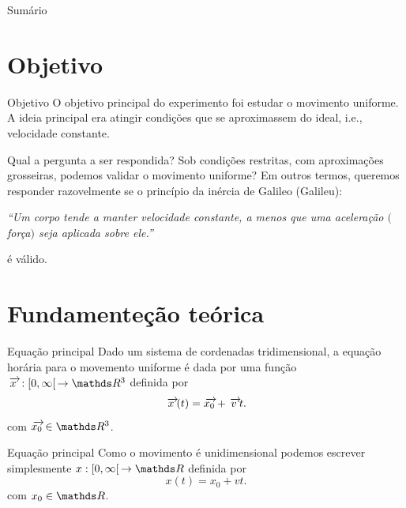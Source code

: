 \documentclass[
  leqno,
  aspectratio=169
]{beamer}
\begin{document}

  \begin{frame}{Sum\'ario}
      \tableofcontents[pausesections]
  \end{frame}
  
  \section{Objetivo}
  \begin{frame}{Objetivo}\justifying
    O objetivo principal do experimento foi estudar o movimento uniforme. A ideia principal era atingir condi\c c\~oes que se aproximassem do ideal, i.e., velocidade constante.
  \end{frame}

  \begin{frame}{Qual a pergunta a ser respondida?}
    Sob condi\c c\~oes restritas, com aproxima\c c\~oes grosseiras, podemos validar o movimento uniforme? Em outros termos, queremos responder razovelmente se o princ\'ipio da in\'ercia de Galileo (Galileu):

    \vskip 1cm
    
    \hfil
    \parbox[c]{10cm}{\sl%
      ``Um corpo tende a manter velocidade constante, a menos que uma acelera\c c\~ao $($for\c ca\/$)$ seja aplicada sobre ele.''
    }
    \hfil
    \vskip 1cm
    \'e v\'alido.
  \end{frame}

  \section{Fundamente\c c\~ao te\'orica}
  \begin{frame}{Equa\c c\~ao principal}
    Dado um sistema de cordenadas tridimensional, a equa\c c\~ao hor\'aria para o movemento uniforme \'e dada por uma fun\c c\~ao $\ora{x}:[0,\infty[\,\ra \R^3$ definida por
    \[
      \ora{x}(t)=\ora{x_0}+\ora{v}t.
    \]
    com $\ora{x_0}\in\R^3$.
  \end{frame}

  \begin{frame}{Equa\c c\~ao principal}
    Como o movimento \'e unidimensional podemos escrever simplesmente $x:[0,\infty[\,\ra \R$ definida por
    \[
      x(t)=x_0+vt.
    \]
    com $x_0\in\R$.
  \end{frame}
\end{document}
